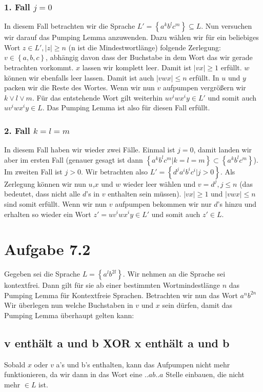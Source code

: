 \documentclass{article}
\begin{document}
\subsubsection*{1. Fall $j=0$}
In diesem Fall betrachten wir die Sprache $L'=\left\{a^kb^lc^m\right\} \subseteq L$. Nun versuchen wir darauf das Pumping Lemma anzuwenden. Dazu wählen wir für ein beliebiges Wort $z\in L',|z|\geq n$ (n ist die Mindestwortlänge) folgende Zerlegung: $v\in \left\{a,b,c\right\}$, abhängig davon dass der Buchstabe in dem Wort das wir gerade betrachten vorkommt. $x$ lassen wir komplett leer. Damit ist $|vx| \geq 1$ erfüllt. $w$ können wir ebenfalls leer lassen. Damit ist auch $|vwx| \leq n$ erfüllt. In $u$ und $y$ packen wir die Reste des Wortes. Wenn wir nun $v$ aufpumpen vergrößern wir $k \vee l \vee m$. Für das entstehende Wort gilt weiterhin $uv^iwx^iy \in L'$ und somit auch $uv^iwx^iy \in L$. Das Pumping Lemma ist also für diesen Fall erfüllt.

\subsubsection*{2. Fall $k=l=m$}
In diesem Fall haben wir wieder zwei Fälle. Einmal ist $j=0$, damit landen wir aber im ersten Fall (genauer gesagt ist dann $\left\{a^kb^lc^m|k=l=m\right\} \subset \left\{a^kb^lc^m\right\}$). Im zweiten Fall ist $j>0$. Wir betrachten also $L'=\left\{d^ja^ib^ic^i|j>0\right\}$. Als Zerlegung können wir nun $u$,$x$ und $w$ wieder leer wählen und $v=d^j, j\leq n$ (das bedeutet, dass nicht alle $d$'s in $v$ enthalten sein müssen). $|vx| \geq 1$ und $|vwx| \leq n$ sind somit erfüllt. Wenn wir nun $v$ aufpumpen bekommen wir nur $d$'s hinzu und erhalten so wieder ein Wort $z' = uv^iwx^iy \in L'$ und somit auch $z' \in L$.


\section*{Aufgabe 7.2}
Gegeben sei die Sprache $L = \left\{ a^lb^{2l} \right\}$. Wir nehmen an die Sprache sei kontextfrei. Dann gilt für sie ab einer bestimmten Wortmindestlänge $n$ das Pumping Lemma für Kontextfreie Sprachen. Betrachten wir nun das Wort $a^nb^{2n}$ Wir überlegen nun welche Buchstaben in $v$ und $x$ sein dürfen, damit das Pumping Lemma überhaupt gelten kann:

\subsection*{v enthält a und b XOR x enthält a und b}
Sobald $x$ oder $v$ a's und b's enthalten, kann das Aufpumpen nicht mehr funktionieren, da wir dann in das Wort eine $..ab..a$ Stelle einbauen, die nicht mehr $\in L$ ist.
\end{document}

